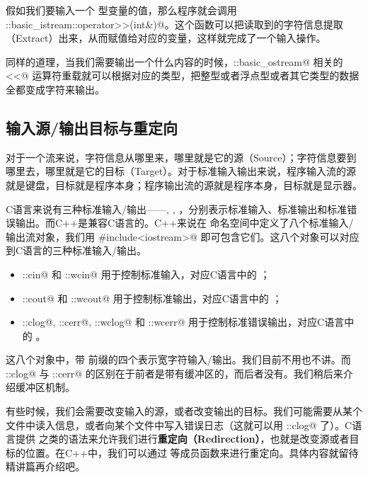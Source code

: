 假如我们要输入一个 \lstinline@int@ 型变量的值，那么程序就会调用 \lstinline@std::basic_istream::operator>>(int&)@。这个函数可以把读取到的字符信息提取（Extract）出来，从而赋值给对应的变量，这样就完成了一个输入操作。\par
同样的道理，当我们需要输出一个什么内容的时候，\lstinline@std::basic_ostream@ 相关的 \lstinline@<<@ 运算符重载就可以根据对应的类型，把整型或者浮点型或者其它类型的数据全都变成字符来输出。\par
\subsection*{输入源/输出目标与重定向}
对于一个流来说，字符信息从哪里来，哪里就是它的源（Source）；字符信息要到哪里去，哪里就是它的目标（Target）。对于标准输入输出来说，程序输入流的源就是键盘，目标就是程序本身；程序输出流的源就是程序本身，目标就是显示器。\par
C语言来说有三种标准输入/输出——\lstinline@stdin@, \lstinline@stdout@, \lstinline@stderr@，分别表示标准输入、标准输出和标准错误输出。而C++是兼容C语言的。C++来说在 \lstinline@std@ 命名空间中定义了八个标准输入/输出流对象，我们用 \lstinline@#include<iostream>@ 即可包含它们。这八个对象可以对应到C语言的三种标准输入/输出。
\begin{itemize}
    \item \lstinline@std::cin@ 和 \lstinline@std::wcin@ 用于控制标准输入，对应C语言中的 \lstinline@stdin@；
    \item \lstinline@std::cout@ 和 \lstinline@std::wcout@ 用于控制标准输出，对应C语言中的 \lstinline@stdout@；
    \item \lstinline@std::clog@, \lstinline@std::cerr@, \lstinline@std::wclog@ 和 \lstinline@std::wcerr@ 用于控制标准错误输出，对应C语言中的 \lstinline@stderr@。
\end{itemize}
这八个对象中，带 \lstinline@w@ 前缀的四个表示宽字符输入/输出。我们目前不用也不讲。而 \lstinline@std::clog@ 与 \lstinline@std::cerr@ 的区别在于前者是带有缓冲区的，而后者没有。我们稍后来介绍缓冲区机制。\par
有些时候，我们会需要改变输入的源，或者改变输出的目标。我们可能需要从某个文件中读入信息，或者向某个文件中写入错误日志（这就可以用 \lstinline@std::clog@ 了）。C语言提供 \lstinline@freopen@ 之类的语法来允许我们进行\textbf{重定向（Redirection）}，也就是改变源或者目标的位置。在C++中，我们可以通过 \lstinline@rdbuf@ 等成员函数来进行重定向。具体内容就留待精讲篇再介绍吧。\par
